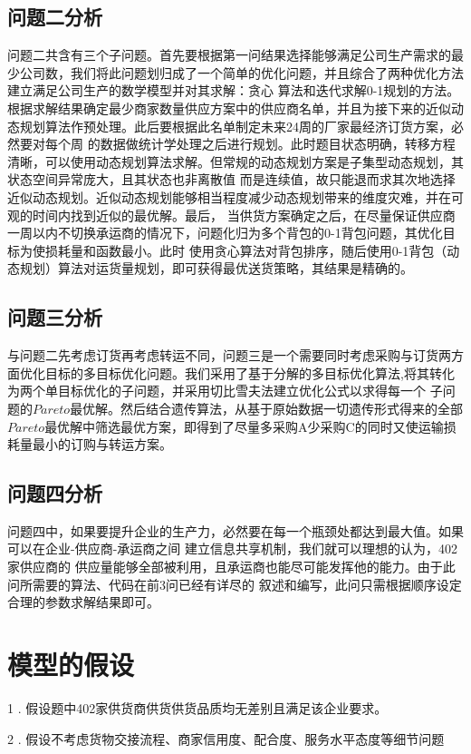 \documentclass{cumcmthesis}
\begin{document}
\subsection{问题二分析}
问题二共含有三个子问题。首先要根据第一问结果选择能够满足公司生产需求的最少公司数，我们将此问题划归成了一个简单的优化问题，并且综合了两种优化方法建立满足公司生产的数学模型并对其求解：贪心
算法和迭代求解0-1规划的方法。根据求解结果确定最少商家数量供应方案中的供应商名单，并且为接下来的近似动态规划算法作预处理。此后要根据此名单制定未来24周的厂家最经济订货方案，必然要对每个周
的数据做统计学处理之后进行规划。此时题目状态明确，转移方程清晰，可以使用动态规划算法求解。但常规的动态规划方案是子集型动态规划，其状态空间异常庞大，且其状态也非离散值
而是连续值，故只能退而求其次地选择近似动态规划。近似动态规划能够相当程度减少动态规划带来的维度灾难，并在可观的时间内找到近似的最优解。最后，
当供货方案确定之后，在尽量保证供应商一周以内不切换承运商的情况下，问题化归为多个背包的0-1背包问题，其优化目标为使损耗量和函数最小。此时
使用贪心算法对背包排序，随后使用0-1背包（动态规划）算法对运货量规划，即可获得最优送货策略，其结果是精确的。

\subsection{问题三分析}
与问题二先考虑订货再考虑转运不同，问题三是一个需要同时考虑采购与订货两方面优化目标的多目标优化问题。我们采用了基于分解的多目标优化算法\cite{3},将其转化为两个单目标优化的子问题，并采用切比雪夫法建立优化公式以求得每一个
子问题的$Pareto$最优解。然后结合遗传算法，从基于原始数据一切遗传形式得来的全部$Pareto$最优解中筛选最优方案，即得到了尽量多采购A少采购C的同时又使运输损耗量最小的订购与转运方案。
\subsection{问题四分析}
问题四中，如果要提升企业的生产力，必然要在每一个瓶颈处都达到最大值。如果可以在企业-供应商-承运商之间
建立信息共享机制，我们就可以理想的认为，402家供应商的
供应量能够全部被利用，且承运商也能尽可能发挥他的能力。由于此问所需要的算法、代码在前3问已经有详尽的
叙述和编写，此问只需根据顺序设定合理的参数求解结果即可。

\section{模型的假设}
1 . 假设题中402家供货商供货供货品质均无差别且满足该企业要求。

2 . 假设不考虑货物交接流程、商家信用度、配合度、服务水平态度等细节问题
\end{document}
